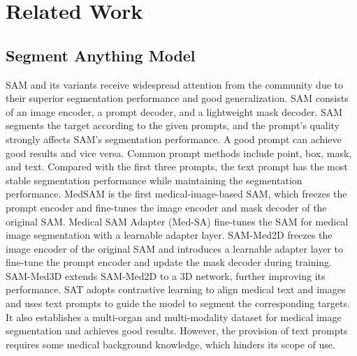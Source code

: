 \section{Related Work}
\subsection{Segment Anything Model}
SAM and its variants \cite{CLIPSAM,MIA-SAM,SAM-review,MIA-SAM,SAM3D,SAT,medlsam,zhang2024challenges,Llama} receive widespread attention from the community due to their superior segmentation performance and good generalization. SAM \cite{SAM} consists of an image encoder, a prompt decoder, and a lightweight mask decoder. SAM segments the target according to the given prompts, and the prompt's quality strongly affects SAM's segmentation performance. A good prompt can achieve good results and vice versa. Common prompt methods include point, box, mask, and text. Compared with the first three prompts, the text prompt has the most stable segmentation performance while maintaining the segmentation performance. MedSAM \cite{MedSAM} is the first medical-image-based SAM, which freezes the prompt encoder and fine-tunes the image encoder and mask decoder of the original SAM.
Medical SAM Adapter (Med-SA) \cite{MedSAM} fine-tunes the SAM for medical image segmentation with a learnable adapter layer.
SAM-Med2D \cite{SAM2D} freezes the image encoder of the original SAM and introduces a learnable adapter layer to fine-tune the prompt encoder and update the mask decoder during training. SAM-Med3D \cite{SAM3D} extends SAM-Med2D to a 3D network, further improving its performance.
SAT \cite{SAT} adopts contrastive learning to align medical text and images and uses text prompts to guide the model to segment the corresponding targets. It also establishes a multi-organ and multi-modality dataset for medical image segmentation and achieves good results. However, the provision of text prompts requires some medical background knowledge, which hinders its scope of use.


